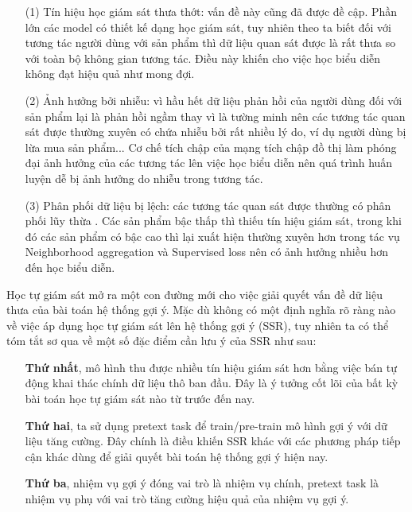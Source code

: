 \begin{itemize}
    \item[(1)] Tín hiệu học giám sát thưa thớt: vấn đề này cũng đã được đề cập. Phần lớn các model có thiết kế dạng học giám sát, tuy nhiên theo ta biết đối với tương tác người dùng với sản phẩm thì dữ liệu quan sát được là rất thưa so với toàn bộ không gian tương tác. Điều này khiến cho việc học biểu diễn không đạt hiệu quả như mong đợi.
    
    \item[(2)] Ảnh hưởng bởi nhiễu: vì hầu hết dữ liệu phản hồi của người dùng đối với sản phẩm lại là phản hồi ngầm thay vì là tường minh \cite{denoise-implicit-feedback} nên các tương tác quan sát được thường xuyên có chứa nhiễu bởi rất nhiều lý do, ví dụ người dùng bị lừa mua sản phẩm... Cơ chế tích chập của mạng tích chập đồ thị làm phóng đại ảnh hưởng của các tương tác lên việc học biểu diễn nên quá trình huấn luyện dễ bị ảnh hưởng do nhiễu trong tương tác.
    
    \item[(3)] Phân phối dữ liệu bị lệch: các tương tác quan sát được thường có phân phối lũy thừa \cite{power-law-dist}. Các sản phẩm bậc thấp thì thiếu tín hiệu giám sát, trong khi đó các sản phẩm có bậc cao thì lại xuất hiện thường xuyên hơn trong tác vụ Neighborhood aggregation và Supervised loss nên có ảnh hưởng nhiều hơn đến học biểu diễn.
\end{itemize}

Học tự giám sát mở ra một con đường mới cho việc giải quyết vấn đề dữ liệu thưa của bài toán hệ thống gợi ý. Mặc dù không có một định nghĩa rõ ràng nào về  việc áp dụng học tự giám sát lên hệ thống gợi ý (SSR), tuy nhiên ta có thể tóm tắt sơ qua về một số đặc điểm \cite{survey:ssl-for-rec-sys} cần lưu ý của SSR như sau:

\begin{itemize}
    \item[] \textbf{Thứ nhất}, mô hình thu được nhiều tín hiệu giám sát hơn bằng việc bán tự động khai thác chính dữ liệu thô ban đầu. Đây là ý tưởng cốt lõi của bất kỳ bài toán học tự giám sát nào từ trước đến nay.
    
    \item[] \textbf{Thứ hai}, ta sử dụng pretext task để train/pre-train mô hình gợi ý với dữ liệu tăng cường. Đây chính là điều khiến SSR khác với các phương pháp tiếp cận khác dùng để giải quyết bài toán hệ thống gợi ý hiện nay.
    
    \item[] \textbf{Thứ ba}, nhiệm vụ gợi ý đóng vai trò là nhiệm vụ chính, pretext task là nhiệm vụ phụ với vai trò tăng cường hiệu quả của nhiệm vụ gợi ý.
\end{itemize}

